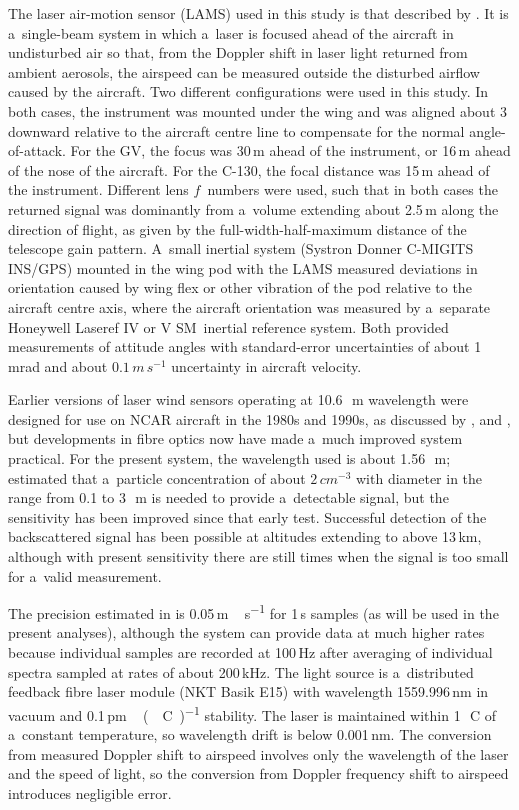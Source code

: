 \documentclass[amtd, online, hvmath]{copernicus}
\begin{document}
The laser air-motion sensor (LAMS) used in this study is that
described by \citet{SpulerEtAl2011}. It is a~single-beam system in
which a~laser is focused ahead of the aircraft in undisturbed air so
that, from the Doppler shift in laser light returned from ambient
aerosols, the airspeed can be measured outside the disturbed airflow
caused by the aircraft. Two different configurations were used in this
study.  In both cases, the instrument was mounted under the wing and was
aligned about 3{\degree} downward relative to the aircraft
centre line to compensate for the normal angle-of-attack. For the GV,
the focus was 30\,m ahead of the instrument, or 16\,m ahead of the
nose of the aircraft. For the C-130, the focal distance was 15\,m
ahead of the instrument. Different lens $f$~numbers were used, such that in
both cases the returned signal was dominantly from a~volume extending
about 2.5\,m along the direction of flight, as given by the
full-width-half-maximum distance of the telescope gain
pattern. A~small inertial system (Systron Donner C-MIGITS INS/GPS)
mounted in the wing pod with the LAMS measured deviations in
orientation caused by wing flex or other vibration of the pod relative
to the aircraft centre axis, where the aircraft orientation was
measured by a~separate Honeywell Laseref IV or V SM~inertial reference
system. Both provided measurements of attitude angles with
standard-error uncertainties of about 1\,\unit{mrad} and about
$0.1\,\unit{m\,s^{-1}}$ uncertainty in aircraft velocity.

Earlier versions of laser wind sensors operating at
10.6\,\unit{{\mu}m} wavelength were designed for use on NCAR aircraft
in the 1980s and 1990s, as discussed by \citet{KeelerEtAl1987},
\citet{KristensenLenschow1987} and \citet{MayorEtAl1997}, but
developments in fibre optics now have made a~much improved system
practical. For the present system, the wavelength used is about
1.56\,\unit{{\mu}m}; \citet{SpulerEtAl2011} estimated that a~particle
concentration of about $2\,\unit{cm^{-3}}$ with diameter in the range
from 0.1 to 3\,\unit{{\mu}m} is needed to provide a~detectable
signal, but the sensitivity has been improved since that early test.
Successful detection of the backscattered signal has been possible at
altitudes extending to above 13\,km, although with present sensitivity
there are still times when the signal is too small for a~valid
measurement.

The precision estimated in \citet{SpulerEtAl2011} is
0.05\,\unit{m\,s^{-1}} for 1\,s samples (as will be used in the
present analyses), although the system can provide data at much higher
rates because individual samples are recorded at 100\,\unit{Hz} after
averaging of individual spectra sampled at rates of about
200\,kHz. The light source is a~distributed feedback fibre laser
module (NKT Basik E15) with wavelength 1559.996\,nm in vacuum and
0.1\,\unit{pm\,({\degree}C)^{-1}} stability. The laser is maintained
within 1\,\unit{{\degree}C} of a~constant temperature, so wavelength
drift is below 0.001\,nm. The conversion from measured Doppler shift
to airspeed involves only the wavelength of the laser and the speed of
light, so the conversion from Doppler frequency shift to airspeed
introduces negligible error.
\end{document}

